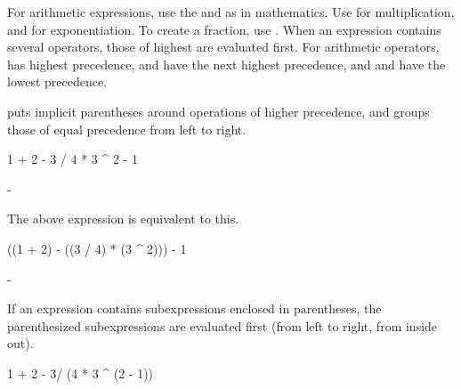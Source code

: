 
For arithmetic expressions, use the \spadop{+} and \spadop{-}
 as in mathematics.
Use \spadop{*} for multiplication, and \spadop{^} for
exponentiation.
To create a fraction, use \spadop{/}.
When an expression contains several operators, those of highest
 are evaluated first.
For arithmetic operators, \spadop{^} has highest precedence,
\spadop{*} and \spadop{/} have the next highest
precedence, and \spadop{+} and \spadop{-} have the lowest
precedence.

\begin{xtc}
\begin{xtccomment}
\Language{} puts implicit parentheses around operations of higher
precedence, and groups those of equal precedence from left to right.
\end{xtccomment}
\begin{spadsrc}
1 + 2 - 3 / 4 * 3 ^ 2 - 1
\end{spadsrc}
\begin{TeXOutput}
\begin{fricasmath}{1}
-{}%
\end{fricasmath}
\end{TeXOutput}
\end{xtc}
\begin{xtc}
\begin{xtccomment}
The above expression is equivalent to this.
\end{xtccomment}
\begin{spadsrc}
((1 + 2) - ((3 / 4) * (3 ^ 2))) - 1
\end{spadsrc}
\begin{TeXOutput}
\begin{fricasmath}{2}
-{}%
\end{fricasmath}
\end{TeXOutput}
\end{xtc}
\begin{xtc}
\begin{xtccomment}
If an expression contains subexpressions enclosed in parentheses,
the parenthesized subexpressions are evaluated first (from left to
right, from inside out).
\end{xtccomment}
\begin{spadsrc}
1 + 2 - 3/ (4 * 3 ^ (2 - 1))
\end{spadsrc}
\begin{TeXOutput}
\begin{fricasmath}{3}
%
\end{fricasmath}
\end{TeXOutput}
\end{xtc}

